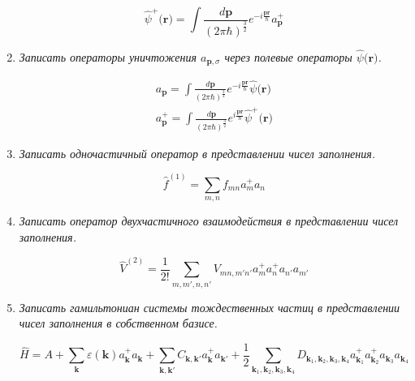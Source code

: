 \documentclass{article}
\begin{document}
\begin{enumerate}
	\begin{equation}
		\hat{\psi}^+(\textbf{r)} = \int \frac{d\textbf{p}}{(2\pi\hbar)^\frac{3}{2}} e^{-i\frac{\textbf{pr}}{\hbar}}a^+_\textbf{p}
	\end{equation}
	
	\item \textit{Записать операторы уничтожения $a_{\textbf{p},\sigma}$ через полевые операторы $\hat{\psi}(\textbf{r)}$.}
	
	\begin{gather}
		a_\textbf{p} = \int \frac{d\textbf{p}}{(2\pi\hbar)^\frac{3}{2}} e^{-i\frac{\textbf{pr}}{\hbar}} \hat{\psi}(\textbf{r)} \\
		a^+_\textbf{p} = \int \frac{d\textbf{p}}{(2\pi\hbar)^\frac{3}{2}} e^{i\frac{\textbf{pr}}{\hbar}} \hat{\psi}^+(\textbf{r)}
	\end{gather}
	
	\item \textit{Записать одночастичный оператор в представлении чисел заполнения.}
	
	\begin{equation}
		\hat{f}^{(1)} = \sum\limits_{m,n} f_{mn} a^+_m a_n
	\end{equation}
	
	\item \textit{Записать оператор двухчастичного взаимодействия в представлении чисел заполнения.}
	
	\begin{equation}
		\hat{V}^{(2)} = \frac{1}{2!}\sum\limits_{m,m',n,n'} V_{mn,m'n'} a^+_m a^+_n a_{n'}a_{m'}
	\end{equation}
	
	\item \textit{Записать гамильтониан системы тождественных частиц в представлении чисел заполнения
в собственном базисе.}

	\begin{equation}
		\hat{H} = A + \sum\limits_{\textbf{k}}\varepsilon(\textbf{k}) a^+_{\textbf{k}}a_{\textbf{k}} + \sum\limits_{\textbf{k},\textbf{k}'}C_{\textbf{k},\textbf{k}'} a^+_{\textbf{k}}a_{\textbf{k}'} + \frac{1}{2}\sum\limits_{\textbf{k}_1,\textbf{k}_2,\textbf{k}_3,\textbf{k}_4}D_{\textbf{k}_1,\textbf{k}_2,\textbf{k}_3,\textbf{k}_4} a^+_{\textbf{k}_1}a^+_{\textbf{k}_2}a_{\textbf{k}_3}a_{\textbf{k}_4}
	\end{equation}
\end{enumerate}
\end{document}
